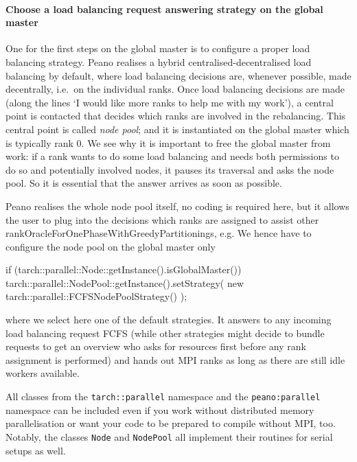 \paragraph{Choose a load balancing request answering strategy on the global
master}
One for the first steps on the global master is to configure a
proper load balancing strategy. 
Peano realises a hybrid centralised-decentralised load balancing by default,
where load balancing decisions are, whenever possible, made decentrally,
i.e.~on the individual ranks.
Once load balancing decisions are made (along the lines `I would like more
ranks to help me with my work'), a central point is contacted that decides which
ranks are involved in the rebalancing.
This central point is called {\em node pool}; 
and it is instantiated on the global master which is typically rank 0.
We see why it is important to free the global master from work: if a rank wants
to do some load balancing and needs both permissions to do so and potentially
involved nodes, it pauses its traversal and asks the node pool.
So it is essential that the answer arrives as soon as possible.


Peano realises the whole node pool itself, no coding is required here, but
it allows the user to plug into the decisions which ranks are assigned to assist
other rankOracleForOnePhaseWithGreedyPartitionings, e.g.
We hence have to configure the node pool on the global master only
\begin{code}
if (tarch::parallel::Node::getInstance().isGlobalMaster()) {
  tarch::parallel::NodePool::getInstance().setStrategy(
    new tarch::parallel::FCFSNodePoolStrategy()
  );
}
\end{code}

\noindent
where we select here one of the default strategies. 
It answers to any incoming load balancing request FCFS (while other strategies
might decide to bundle requests to get an overview who asks for resources first
before any rank assignment is performed) and hands out MPI ranks as long as
there are still idle workers available.


\begin{remark}
 All classes from the \texttt{tarch::parallel} namespace and the
 \texttt{peano:parallel} namespace can be included even if you work without
 distributed memory parallelisation or want your code to be prepared to compile without MPI, too.
 Notably, the classes \texttt{Node} and \texttt{NodePool} all implement their
 routines for serial setups as well.
\end{remark}


